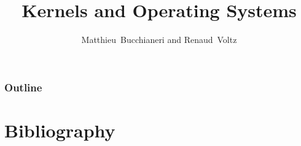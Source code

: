 %
%
%
%
%
%

%
%

\newcommand{\path}{../../..}

%
%



%
%

\title{Kernels and Operating Systems}

%
%

\author
{
  Matthieu~Bucchianeri and Renaud~Voltz
}

%
%

%

%
%



%
%

\begin{frame}
  \titlepage

  \begin{center}
    \logos
  \end{center}
\end{frame}

%
%

\begin{frame}
  \frametitle{Outline}
  \tableofcontents
\end{frame}

%
%








%
%

\section{Bibliography}





